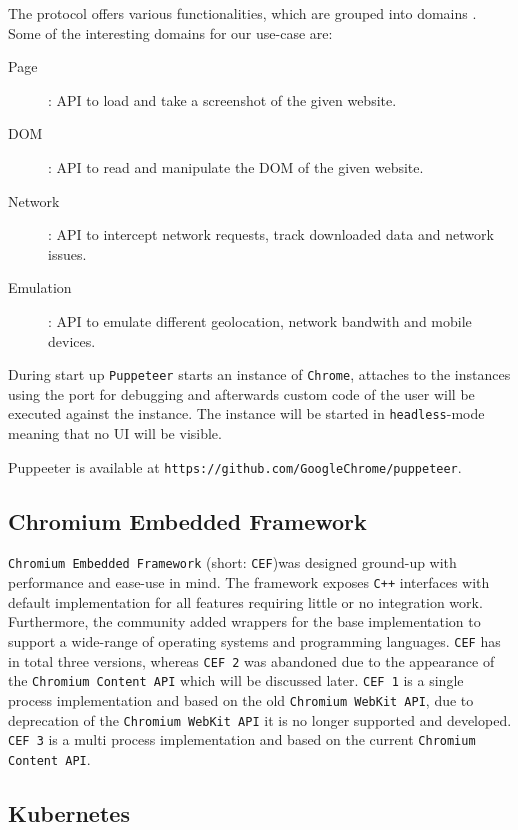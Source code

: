 The protocol offers various functionalities, which are grouped into domains \cite{DevToolsProtocol}. Some of the interesting domains for our use-case are:
\begin{description}
	\item[Page]: API to load and take a screenshot of the given website.
	\item[DOM]: API to read and manipulate the DOM of the given website.
	\item[Network]: API to intercept network requests, track downloaded data and network issues.
	\item[Emulation]: API to emulate different geolocation, network bandwith and mobile devices.
\end{description}

During start up \texttt{Puppeteer} starts an instance of \texttt{Chrome}, attaches to the instances using the port for debugging and afterwards custom code of the user will be executed against the instance. The instance will be started in \texttt{headless}-mode meaning that no UI will be visible.

Puppeeter is available at \texttt{https://github.com/GoogleChrome/puppeteer}.

\subsection{Chromium Embedded Framework}
\label{cef}
\texttt{Chromium Embedded Framework} (short: \texttt{CEF})was designed ground-up with performance and ease-use in mind. The framework exposes \texttt{C++} interfaces with default implementation for all features requiring little or no integration work. Furthermore, the community added wrappers for the base implementation to support a wide-range of operating systems and programming languages.
\texttt{CEF} has in total three versions, whereas \texttt{CEF 2} was abandoned due to the appearance of the \texttt{Chromium Content API} which will be discussed later. \texttt{CEF 1} is a single process implementation and based on the old \texttt{Chromium WebKit API}, due to deprecation of the \texttt{Chromium WebKit API} it is no longer supported and developed. \texttt{CEF 3} is a multi process implementation and based on the current \texttt{Chromium Content API}.

\subsection{Kubernetes}

